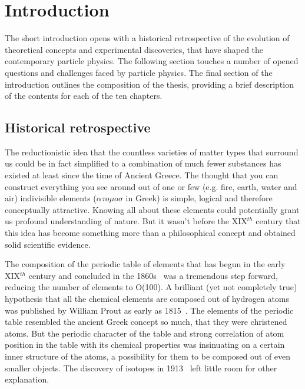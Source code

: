 \section{Introduction}
The short introduction opens with a historical retrospective of the evolution of theoretical concepts and experimental discoveries, that have shaped the contemporary particle physics. The following section touches a number of opened questions and challenges faced by particle physics. The final section of the introduction outlines the composition of the thesis, providing a brief description of the contents for each of the ten chapters.
\subsection{Historical retrospective}
    The reductionistic idea that the countless varieties of matter types that surround us could be in fact simplified to a combination of much fewer substances has existed at least since the time of Ancient Greece. The thought that you can construct everything you see around out of one or few (e.g. fire, earth, water and air) indivisible elements ($\alpha \tau o \mu o \sigma$ in Greek) is simple, logical and therefore conceptually attractive. Knowing all about these elements could potentially grant us profound understanding of nature. But it wasn't before the XIX$^{th}$ century that this idea has become something more than a philosophical concept and obtained solid scientific evidence. 

The composition of the periodic table of elements that has begun in the early XIX$^{th}$ century and concluded in the 1860s~\cite{mendel} was a tremendous step forward, reducing the number of elements to O(100). A brilliant (yet not completely true) hypothesis that all the chemical elements are composed out of hydrogen atoms was published by William Prout as early as 1815~\cite{prout}. The elements of the periodic table resembled the ancient Greek concept so much, that they were christened atoms. But the periodic character of the table and strong correlation of atom position in the table with its chemical properties was insinuating on a certain inner structure of the atoms, a possibility for them to be composed out of even smaller objects. The discovery of isotopes in 1913~\cite{isotopes} left little room for other explanation.

